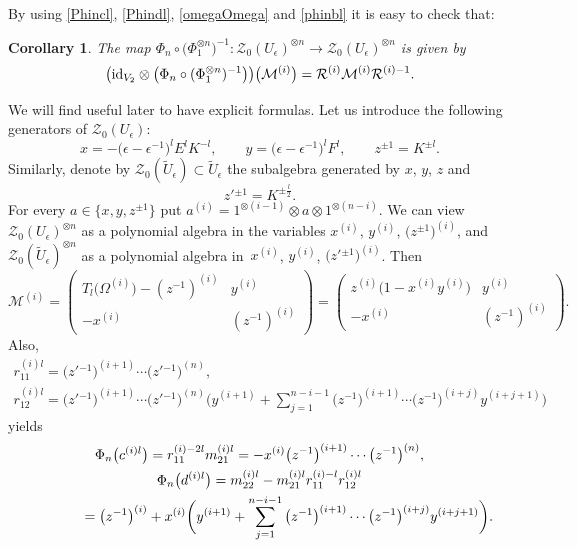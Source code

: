 \documentclass[pdftex]{sigma}%
\numberwithin{equation}{section}
\numberwithin{figure}{section}
\newtheorem{cor}[teo]{Corollary}
\newcommand{\e}{\epsilon}
\newcommand{\ra}{\rightarrow}
\begin{document}
By using \eqref{Phincl}, \eqref{Phindl}, \eqref{omegaOmega} and \eqref{phinbl} it is easy to check that:
\begin{cor} \label{dressingcenter} The map $\Phi_n \circ \big(\Phi_1^{\otimes n}\big)^{-1} \colon \mathcal{Z}_0(U_\epsilon)^{\otimes n} \ra \mathcal{Z}_0(U_\epsilon)^{\otimes n}$ is given by
 \[
 \big({\rm id}_{V_2} \otimes \big(\Phi_n \circ (\Phi_1^{\otimes n})^{-1}\big)\big)\big(\mathcal{M}^{(i)}\big) = \mathcal{R}^{(i)}\mathcal{M}^{(i)}\mathcal{R}^{(i)-1}.
 \]
\end{cor}
We will find useful later to have explicit formulas. Let us introduce the following generators of $\mathcal{Z}_0(U_\epsilon)$:
\begin{equation}\label{pref}
x= -\big(\e-\e^{-1}\big)^{l}E^lK^{-l}, \qquad
y=\big(\e-\e^{-1}\big)^{l}F^l,\qquad
z^{\pm 1}= K^{\pm l}.
\end{equation}
Similarly, denote by $\mathcal{Z}_0(\tilde U_\epsilon)\subset \tilde U_\epsilon$ the subalgebra generated by $x$, $y$, $z$ and
\[
z'{}^{\pm 1}= K^{\pm\frac{ l}{2}}.
\]
For every $a\in \big\{x,y,z^{\pm 1}\big\}$ put $a^{(i)} = 1^{\otimes (i-1)} \otimes a \otimes 1^{\otimes (n-i)}$. We can view $\mathcal{Z}_0(U_\epsilon)^{\otimes n}$ as a polynomial algebra in the variables $x^{(i)}$, $y^{(i)}$, $\big(z^{\pm 1}\big)^{(i)}$, and $\mathcal{Z}_0(\tilde U_\epsilon)^{\otimes n}$ as a polynomial algebra in~$x^{(i)}$, $y^{(i)}$, $\big(z'{}^{\pm 1}\big)^{(i)}$.
Then
\begin{equation}\label{Mcal}
\mathcal{M}^{(i)} = \begin{pmatrix} T_l\big(\Omega^{(i)}\big)- (z^{-1})^{(i)} & y^{(i)}\\[.5ex] -x^{(i)} & (z^{-1})^{(i)} \end{pmatrix} = \begin{pmatrix} z^{(i)}\big(1-x^{(i)}y^{(i)}\big) & y^{(i)}\\[.5ex] -x^{(i)} & (z^{-1})^{(i)} \end{pmatrix}\!.
 \end{equation}
Also,
\begin{gather}
r_{11}^{(i)l} = \big(z'{}^{-1}\big)^{(i+1)}\cdots \big(z'{}^{-1}\big)^{(n)}, \label{g11l}
\\
r_{12}^{(i)l} = \big(z'{}^{-1}\big)^{(i+1)}\cdots \big(z'{}^{-1}\big)^{(n)} \bigg(y^{(i+1)} + \sum_{j=1}^{n-i-1} \big(z^{-1}\big)^{(i+1)}\cdots \big(z^{-1}\big)^{(i+j)}y^{(i+j+1)}\bigg)\label{g12l}
\end{gather}
yields
\begin{gather*}
\Phi_n\big(c^{(i)l}\big) = r_{11}^{(i)-2l}m_{21}^{(i)l} =-x^{(i)} \big(z^{-1}\big)^{(i+1)}\cdots \big(z^{-1}\big)^{(n)},
\label{phinclbis}
\\
\Phi_n\big(d^{(i)l}\big) = m_{22}^{(i)l} - m_{21}^{(i)l} r_{11}^{(i)-l}r_{12}^{(i)l} \notag
\\ \hphantom{\Phi_n\big(d^{(i)l}\big)}
{} = \big(z^{-1}\big)^{(i)} + x^{(i)}\bigg(y^{(i+1)} + \sum_{j=1}^{n-i-1} \big(z^{-1}\big)^{(i+1)}\cdots \big(z^{-1}\big)^{(i+j)} y^{(i+j+1)}\bigg)\label{phindlbis} .
\end{gather*}
\end{document}
